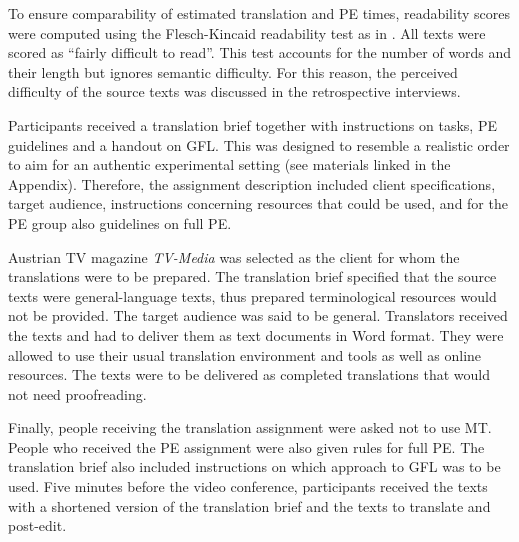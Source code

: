 To ensure comparability of estimated translation and PE times, readability scores were computed using the Flesch-Kincaid readability test \citep{kincaid1975derivation} as in \textcite{lopez2016can}.  All texts were scored as ``fairly difficult to read''. This test accounts for the number of words and their length but ignores semantic difficulty. For this reason, the perceived difficulty of the source texts was discussed in the retrospective interviews. 


Participants received a translation brief together with instructions on tasks, PE guidelines and a handout on GFL. This was designed to resemble a realistic order to aim for an authentic experimental setting (see materials linked in the Appendix). Therefore, the assignment description included client specifications, target audience, instructions concerning resources that could be used, and for the PE group also guidelines on full PE.

Austrian TV magazine \textit{TV-Media} was selected as the client for whom the translations were to be prepared. The translation brief specified that the source texts were general-language texts, thus prepared terminological resources would not be provided. The target audience was said to be general. Translators received the texts and had to deliver them as text documents in Word format. They were allowed to use their usual translation environment and tools as well as online resources. The texts were to be delivered as completed translations that would not need proofreading. 

Finally, people receiving the translation assignment were asked not to use MT. People who received the PE assignment were also given rules for full PE. The translation brief also included instructions on which approach to GFL was to be used. Five minutes before the video conference, participants received the texts with a shortened version of the translation brief and the texts to translate and post-edit.

